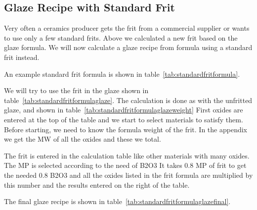 \subsection{Glaze Recipe with Standard Frit}
Very often a ceramics producer gets the frit from a commercial supplier or 
wants to use only a few standard frits. Above we calculated a new frit based on 
the glaze formula. We will now calculate a glaze recipe from formula using a 
standard frit instead.

An example standard frit formula is shown in 
table~\ref{tab:standardfritformula}. 

We will try to use the frit in the glaze 
shown in table~\ref{tab:standardfritformulaglaze}. The calculation is done as 
with the unfritted glaze, and shown in 
table~\ref{tab:standardfritformulaglazeweight} First oxides are entered at the 
top of the table and we start to select materials to satisfy them. Before 
starting, we need to know the formula weight of the frit. In the appendix we 
get the MW of all the oxides and these we total.

The frit is entered in the calculation table like other materials with many 
oxides. The MP is selected according to the need of B2O3 It takes 0.8 MP of 
frit to get the needed 0.8 B2O3 and all the oxides listed in the frit formula 
are multiplied by this number and the results entered on the right of the table.

The final glaze recipe is shown in 
table~\ref{tab:standardfritformulaglazefinal}.

